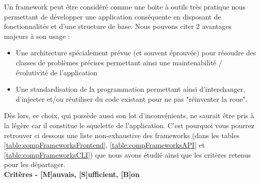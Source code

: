 Un framework peut être considéré comme une boite à outils très pratique nous permettant de développer une application conséquente en disposant de fonctionnalités et d'une structure de base. Nous pouvons citer 2 avantages majeurs à son usage : 
\begin{itemize}
    \item Une architecture spécialement prévue (et souvent éprouvée) pour résoudre des classes de problèmes précises permettant ainsi une maintenabilité / évolutivité  de l'application
    \item Une standardisation de la programmation permettant ainsi d'interchanger, d'injecter et/ou réutiliser du code existant pour ne pas "réinventer la roue".
\end{itemize}
Dès lors, ce choix, qui possède aussi son lot d'inconvénients, ne saurait être pris à la légère car il constitue le squelette de l'application. C'est pourquoi vous pourrez retrouver ci dessous une liste non-exhaustive des frameworks (dans les tables \ref{table:compFrameworksFrontend}, \ref{table:compFrameworksAPI} et \ref{table:compFrameworksCLI}) que nous avons étudié ainsi que les critères retenus pour les départager. \\

\noindent\textbf{Critères - [M]auvais, [S]ufficient, [B]on}

